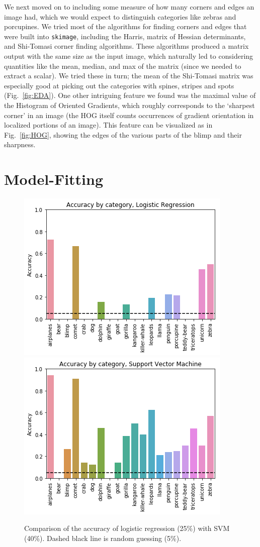 \documentclass[aps,prl,twocolumn,superscriptaddress]{revtex4-1}
\renewcommand{\=}[1]{\stackrel{#1}{=}} %
\begin{document}
We next moved on to including some measure of how many corners and edges an image had, which we would expect to distinguish categories like zebras and porcupines. We tried most of the algorithms for finding corners and edges that were built into \texttt{skimage}, including the Harris, matrix of Hessian determinants, and Shi-Tomasi corner finding algorithms. These algorithms produced a matrix output with the same size as the input image, which naturally led to considering quantities like the mean, median, and max of the matrix (since we needed to extract a scalar). We tried these in turn; the mean of the Shi-Tomasi matrix was especially good at picking out the categories with spines, stripes and spots (Fig.~\ref{fig:EDA}). One other intriguing feature we found was the maximal value of the Histogram of Oriented Gradients, which roughly corresponds to the `sharpest corner' in an image (the HOG itself counts occurrences of gradient orientation in localized portions of an image). This feature can be visualized as in Fig.~\ref{fig:HOG}, showing the edges of the various parts of the blimp and their sharpness.


\section{Model-Fitting}

\begin{figure}
	\includegraphics[width = 0.49\columnwidth]{logreg.png}
	\includegraphics[width = 0.49\columnwidth]{SVM.png}
	\caption{\label{fig:models} Comparison of the accuracy of logistic regression (25\%) with SVM (40\%). Dashed black line is random guessing (5\%).}
\end{figure}
\end{document}
